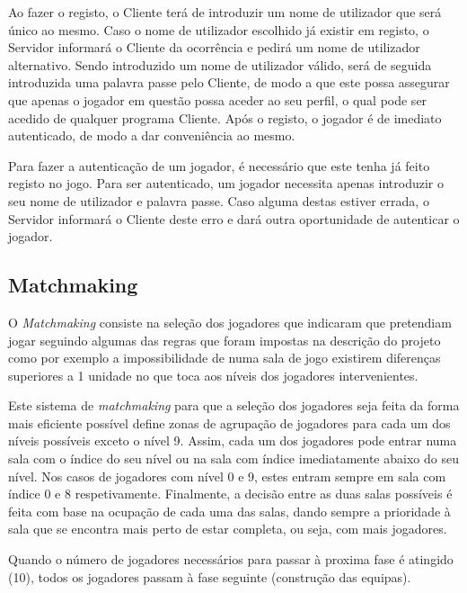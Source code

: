 \documentclass[a4paper]{article}
\begin{document}
\par Ao fazer o registo, o Cliente terá de introduzir um nome de utilizador que será único ao mesmo. Caso o nome de utilizador escolhido já existir em registo, o Servidor informará o Cliente da ocorrência e pedirá um nome de utilizador alternativo. Sendo introduzido um nome de utilizador válido, será de seguida introduzida uma palavra passe pelo Cliente, de modo a que este possa assegurar que apenas o jogador em questão possa aceder ao seu perfil, o qual pode ser acedido de qualquer programa Cliente. Após o registo, o jogador é de imediato autenticado, de modo a dar conveniência ao mesmo.

\par Para fazer a autenticação de um jogador, é necessário que este tenha já feito registo no jogo. Para ser autenticado, um jogador necessita apenas introduzir o seu nome de utilizador e palavra passe. Caso alguma destas estiver errada, o Servidor informará o Cliente deste erro e dará outra oportunidade de autenticar o jogador. 



\subsection{Matchmaking}
\label{sec:3.2}

\hspace{3mm} O \textit{Matchmaking} consiste na seleção dos jogadores que indicaram que pretendiam jogar seguindo algumas das regras que foram impostas na descrição do projeto como por exemplo a impossibilidade de numa sala de jogo existirem diferenças superiores a 1 unidade no que toca aos níveis dos jogadores intervenientes.

\par Este sistema de \textit{matchmaking} para que a seleção dos jogadores seja feita da forma mais eficiente possível define zonas de agrupação de jogadores para cada um dos níveis possíveis exceto o nível 9. Assim, cada um dos jogadores pode entrar numa sala com o índice do seu nível ou na sala com índice imediatamente abaixo do seu nível. Nos casos de jogadores com nível 0 e 9, estes entram sempre em sala com índice 0 e 8 respetivamente. Finalmente, a decisão entre as duas salas possíveis é feita com base na ocupação de cada uma das salas, dando sempre a prioridade à sala que se encontra mais perto de estar completa, ou seja, com mais jogadores.

\par Quando o número de jogadores necessários para passar à proxima fase é atingido (10), todos os jogadores passam à fase seguinte (construção das equipas).
\end{document}
